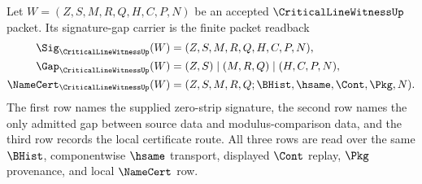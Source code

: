 \begin{definition}
\label{def:critical-line-witness-signature-gap-carrier}
Let $W=(Z,S,M,R,Q,H,C,P,N)$ be an accepted $\CriticalLineWitnessUp$ packet. Its signature-gap carrier is the finite packet readback
$$
\begin{aligned}
\Sig_{\CriticalLineWitnessUp}(W)
  &= (Z,S,M,R,Q,H,C,P,N),\\
\Gap_{\CriticalLineWitnessUp}(W)
  &= (Z,S)\mid(M,R,Q)\mid(H,C,P,N),\\
\NameCert_{\CriticalLineWitnessUp}(W)
  &= (Z,S,M,R,Q;\BHist,\hsame,\Cont,\Pkg,N).
\end{aligned}
$$
The first row names the supplied zero-strip signature, the second row names the only admitted gap between source data and modulus-comparison data, and the third row records the local certificate route. All three rows are read over the same $\BHist$, componentwise $\hsame$ transport, displayed $\Cont$ replay, $\Pkg$ provenance, and local $\NameCert$ row.
\end{definition}

